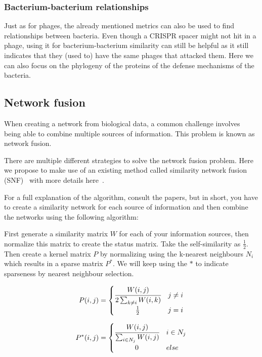 \documentclass{article}
\begin{document}
\subsubsection{Bacterium-bacterium relationships}

Just as for phages, the already mentioned metrics can also be used to find
relationships between bacteria. Even though a CRISPR spacer might not hit
in a phage, using it for bacterium-bacterium similarity can still be helpful
as it still indicates that they (used to) have the same phages that attacked them.
Here we can also focus on the phylogeny
of the proteins of the defense mechanisms of the bacteria.

\subsection{Network fusion}

When creating a network from biological data, a common challenge involves
being able to combine multiple sources of information. This problem is
known as network fusion. 

There are multiple different strategies to solve the network fusion problem. 
Here we propose to make use of an existing method called 
similarity network fusion (SNF)~\cite{wang2014similarity}
with more details here~\cite{wang2012unsupervised}.

For a full explanation of the algorithm,
consult the papers, but in short, you have to create a similarity network
for each source of information and then combine the networks using the 
following algorithm:

First generate a similarity matrix $W$ for each of your information sources, 
then normalize this matrix to create the status matrix.
Take the self-similarity as $\frac{1}{2}$.
Then create a kernel matrix $P$ 
by normalizing using the k-nearest neighbours $N_i$ which 
results in a sparse matrix $P^*$. We will keep using the $*$ to indicate sparseness
by nearest neighbour selection.

\begin{equation}
    P(i, j) = 
    \begin{cases}
        \cfrac{W(i, j)}{2 \sum_{k \neq i}W(i, k)} & j \neq i \\
        \hfil \frac{1}{2} & j = i
    \end{cases}
\end{equation}

\begin{equation} \label{eq:normsparse}
    P^*(i, j) = 
    \begin{cases}
        \cfrac{W(i, j)}{\sum_{i \in N_j}W(i, j)} & i \in N_j \\
        \hfil 0 & else
    \end{cases}
\end{equation} 
\end{document}
